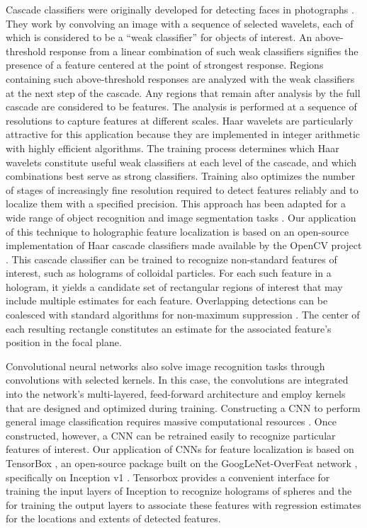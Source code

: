 Cascade classifiers were originally developed for detecting 
faces in photographs \cite{viola2001rapid}. 
They work by convolving an image with a sequence of 
selected wavelets, each of which is considered to be a
``weak classifier'' for objects of interest.
An above-threshold response from a linear combination of such
weak classifiers signifies the presence of a feature
centered at the point of strongest response.
Regions containing such above-threshold responses are analyzed
with the weak classifiers at the next step of the cascade.
Any regions that remain after analysis by the full cascade are
considered to be features.
The analysis is performed at a sequence of resolutions to capture
features at different scales.
Haar wavelets are particularly attractive
for this application because they are implemented in
integer arithmetic with highly efficient algorithms.
The training process determines
which Haar wavelets constitute useful weak classifiers
at each level of the cascade, and which combinations best
serve as strong classifiers.
Training also optimizes the number of stages of increasingly
fine resolution required to detect features reliably and to
localize them with a specified precision.
This approach has been adapted for a wide range of
object recognition and image segmentation tasks
\cite{lienhart2002extended}.
Our application of this technique to holographic feature 
localization is based on an open-source implementation
of Haar cascade classifiers made 
available by the OpenCV project \cite{itseez2015opencv}.
This cascade classifier can be trained to recognize non-standard
features of interest, such as holograms of colloidal particles.
For each such feature in a hologram, it yields
a candidate set of rectangular regions of interest that
may include multiple estimates for each feature.
Overlapping detections can be coalesced with
standard algorithms for non-maximum suppression
\cite{neubeck06}.
The center of each resulting rectangle constitutes an
estimate for the associated feature's position in the focal plane.

Convolutional neural networks also solve image recognition
tasks through convolutions with selected kernels. In this case,
the convolutions are integrated into the network's
multi-layered, feed-forward architecture 
\cite{sermanet2013overfeat} and employ kernels that are designed
and optimized during training.
Constructing a CNN to perform general image classification 
requires massive computational resources \cite{tensorflow2015-whitepaper}.
Once constructed, however, a CNN can be
retrained easily to recognize particular features of interest.
Our application of CNNs for feature localization is based on 
TensorBox \cite{stewart2015endtoend}, an open-source package 
built on the GoogLeNet-OverFeat network \cite{sermanet2013overfeat},
specifically on Inception v1 \cite{szegedy15}.
Tensorbox provides a convenient interface for training the
input layers of Inception to recognize holograms of spheres
and the for training the output layers to associate these features
with regression estimates for the
locations and extents of detected features.

